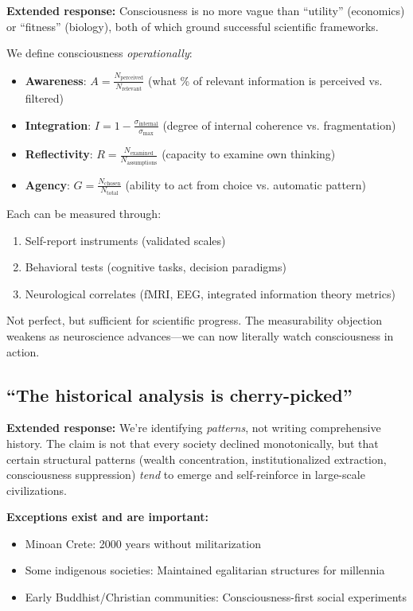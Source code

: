 \documentclass[11pt,a4paper]{article}
\theoremstyle{definition}
\theoremstyle{remark}
\begin{document}
\textbf{Extended response:} Consciousness is no more vague than ``utility'' (economics) or ``fitness'' (biology), both of which ground successful scientific frameworks.

We define consciousness \textit{operationally}:
\begin{itemize}[leftmargin=1.5em]
    \item \textbf{Awareness}: $A = \frac{N_{\text{perceived}}}{N_{\text{relevant}}}$ (what \% of relevant information is perceived vs. filtered)
    \item \textbf{Integration}: $I = 1 - \frac{\sigma_{\text{internal}}}{\sigma_{\text{max}}}$ (degree of internal coherence vs. fragmentation)
    \item \textbf{Reflectivity}: $R = \frac{N_{\text{examined}}}{N_{\text{assumptions}}}$ (capacity to examine own thinking)
    \item \textbf{Agency}: $G = \frac{N_{\text{chosen}}}{N_{\text{total}}}$ (ability to act from choice vs. automatic pattern)
\end{itemize}

Each can be measured through:
\begin{enumerate}
    \item Self-report instruments (validated scales)
    \item Behavioral tests (cognitive tasks, decision paradigms)
    \item Neurological correlates (fMRI, EEG, integrated information theory metrics)
\end{enumerate}

Not perfect, but sufficient for scientific progress. The measurability objection weakens as neuroscience advances---we can now literally watch consciousness in action.

\subsection{``The historical analysis is cherry-picked''}

\textbf{Extended response:} We're identifying \textit{patterns}, not writing comprehensive history. The claim is not that every society declined monotonically, but that certain structural patterns (wealth concentration, institutionalized extraction, consciousness suppression) \textit{tend} to emerge and self-reinforce in large-scale civilizations.

\textbf{Exceptions exist and are important:}
\begin{itemize}[leftmargin=1.5em]
    \item Minoan Crete: 2000 years without militarization
    \item Some indigenous societies: Maintained egalitarian structures for millennia
    \item Early Buddhist/Christian communities: Consciousness-first social experiments
\end{itemize}
\end{document}

